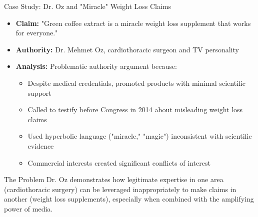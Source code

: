 \documentclass{beamer}
\begin{document}
\begin{frame}{Case Study: Dr. Oz and "Miracle" Weight Loss Claims}
	\begin{itemize}
		\item \textbf{Claim:} "Green coffee extract is a miracle weight loss supplement that works for everyone."
		\item \textbf{Authority:} Dr. Mehmet Oz, cardiothoracic surgeon and TV personality
		\item \textbf{Analysis:} Problematic authority argument because:
		\begin{itemize}
			\item Despite medical credentials, promoted products with minimal scientific support
			\item Called to testify before Congress in 2014 about misleading weight loss claims
			\item Used hyperbolic language ("miracle," "magic") inconsistent with scientific evidence
			\item Commercial interests created significant conflicts of interest
		\end{itemize}
	\end{itemize}
	
	\begin{alertblock}{The Problem}
		Dr. Oz demonstrates how legitimate expertise in one area (cardiothoracic surgery) can be leveraged inappropriately to make claims in another (weight loss supplements), especially when combined with the amplifying power of media.
	\end{alertblock}
\end{frame}
\end{document}
